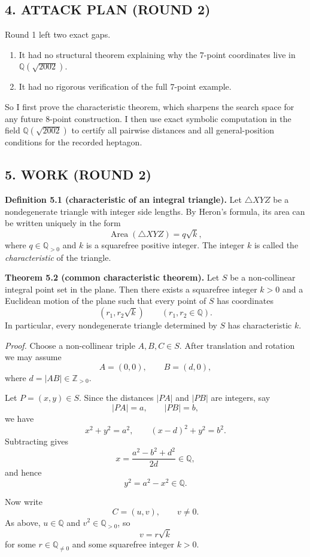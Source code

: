 \subsection*{4. ATTACK PLAN (ROUND 2)}
Round 1 left two exact gaps.
\begin{enumerate}
\item It had no structural theorem explaining why the $7$-point coordinates live in $\mathbb{Q}(\sqrt{2002})$.
\item It had no rigorous verification of the full $7$-point example.
\end{enumerate}
So I first prove the characteristic theorem, which sharpens the search space for any future $8$-point construction. I then use exact symbolic computation in the field $\mathbb{Q}(\sqrt{2002})$ to certify all pairwise distances and all general-position conditions for the recorded heptagon.

\subsection*{5. WORK (ROUND 2)}

\medskip
\noindent\textbf{Definition 5.1 (characteristic of an integral triangle).}
Let $\triangle XYZ$ be a nondegenerate triangle with integer side lengths. By Heron's formula, its area can be written uniquely in the form
\[
\operatorname{Area}(\triangle XYZ)=q\sqrt{k},
\]
where $q\in \mathbb{Q}_{>0}$ and $k$ is a squarefree positive integer. The integer $k$ is called the \emph{characteristic} of the triangle.

\medskip
\noindent\textbf{Theorem 5.2 (common characteristic theorem).}
Let $S$ be a non-collinear integral point set in the plane. Then there exists a squarefree integer $k>0$ and a Euclidean motion of the plane such that every point of $S$ has coordinates
\[
(r_1,r_2\sqrt{k}) \qquad (r_1,r_2\in \mathbb{Q}).
\]
In particular, every nondegenerate triangle determined by $S$ has characteristic $k$.

\smallskip
\noindent\emph{Proof.}
Choose a non-collinear triple $A,B,C\in S$. After translation and rotation we may assume
\[
A=(0,0), \qquad B=(d,0),
\]
where $d=|AB|\in \mathbb{Z}_{>0}$.

Let $P=(x,y)\in S$. Since the distances $|PA|$ and $|PB|$ are integers, say
\[
|PA|=a,\qquad |PB|=b,
\]
we have
\[
x^2+y^2=a^2,\qquad (x-d)^2+y^2=b^2.
\]
Subtracting gives
\[
x=\frac{a^2-b^2+d^2}{2d}\in \mathbb{Q},
\]
and hence
\[
y^2=a^2-x^2\in \mathbb{Q}.
\]

Now write
\[
C=(u,v),\qquad v\neq 0.
\]
As above, $u\in \mathbb{Q}$ and $v^2\in \mathbb{Q}_{>0}$, so
\[
v=r\sqrt{k}
\]
for some $r\in \mathbb{Q}_{\neq 0}$ and some squarefree integer $k>0$.

